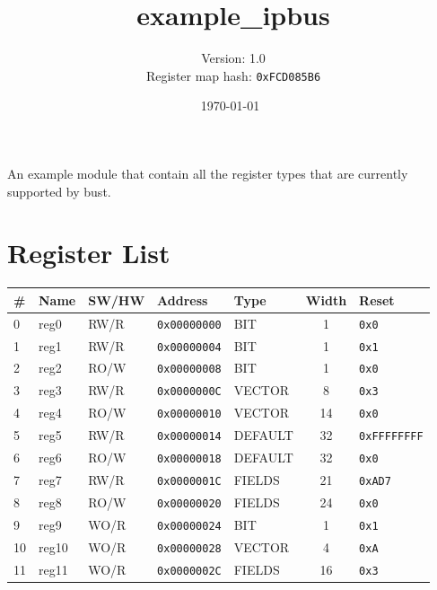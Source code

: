 \documentclass{article}
\title{example{\_}ipbus}
\author{Version: 1.0 \\ Register map hash: \texttt{0xFCD085B6}}
\date{\today\ \currenttime}
\begin{document}
\maketitle
\thispagestyle{fancy}

An example module that contain all the register types that are currently supported by bust.

\section{Register List}

\begin{table}[h!]
  \begin{center}
    \label{tab:table1}
    \begin{tabularx}{\linewidth}{|l|X|l|l|l|c|l|}
      \hline
      \textbf{\#} & \textbf{Name} & \textbf{SW/HW} & \textbf{Address} & \textbf{Type} & \textbf{Width} &
      \textbf{Reset} \\
      \hline
      0 & reg0 & RW/R & \texttt{0x00000000} & BIT & 1 & \texttt{0x0} \\
      \hline
      1 & reg1 & RW/R & \texttt{0x00000004} & BIT & 1 & \texttt{0x1} \\
      \hline
      2 & reg2 & RO/W & \texttt{0x00000008} & BIT & 1 & \texttt{0x0} \\
      \hline
      3 & reg3 & RW/R & \texttt{0x0000000C} & VECTOR & 8 & \texttt{0x3} \\
      \hline
      4 & reg4 & RO/W & \texttt{0x00000010} & VECTOR & 14 & \texttt{0x0} \\
      \hline
      5 & reg5 & RW/R & \texttt{0x00000014} & DEFAULT & 32 & \texttt{0xFFFFFFFF} \\
      \hline
      6 & reg6 & RO/W & \texttt{0x00000018} & DEFAULT & 32 & \texttt{0x0} \\
      \hline
      7 & reg7 & RW/R & \texttt{0x0000001C} & FIELDS & 21 & \texttt{0xAD7} \\
      \hline
      8 & reg8 & RO/W & \texttt{0x00000020} & FIELDS & 24 & \texttt{0x0} \\
      \hline
      9 & reg9 & WO/R & \texttt{0x00000024} & BIT & 1 & \texttt{0x1} \\
      \hline
      10 & reg10 & WO/R & \texttt{0x00000028} & VECTOR & 4 & \texttt{0xA} \\
      \hline
      11 & reg11 & WO/R & \texttt{0x0000002C} & FIELDS & 16 & \texttt{0x3} \\
      \hline
    \end{tabularx}
  \end{center}
\end{table}
\end{document}
